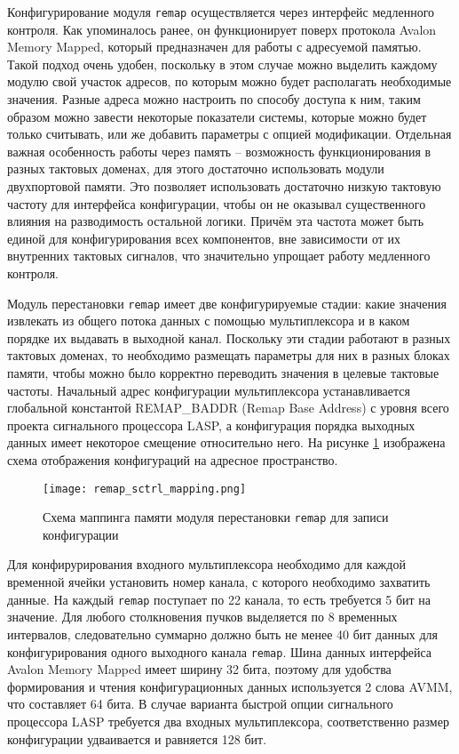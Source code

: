 Конфигурирование модуля \texttt{remap} осуществляется через интерфейс медленного контроля. Как упоминалось ранее, он функционирует поверх протокола Avalon Memory Mapped, который предназначен для работы с адресуемой памятью. Такой подход очень удобен, поскольку в этом случае можно выделить каждому модулю свой участок адресов, по которым можно будет располагать необходимые значения. Разные адреса можно настроить по способу доступа к ним, таким образом можно завести некоторые показатели системы, которые можно будет только считывать, или же добавить параметры с опцией модификации. Отдельная важная особенность работы через память -- возможность функционирования в разных тактовых доменах, для этого достаточно использовать модули двухпортовой памяти. Это позволяет использовать достаточно низкую тактовую частоту для интерфейса конфигурации, чтобы он не оказывал существенного влияния на разводимость остальной логики. Причём эта частота может быть единой для конфигурирования всех компонентов, вне зависимости от их внутренних тактовых сигналов, что значительно упрощает работу медленного контроля.\par
Модуль перестановки \texttt{remap} имеет две конфигурируемые стадии: какие значения извлекать из общего потока данных с помощью мультиплексора и в каком порядке их выдавать в выходной канал. Поскольку эти стадии работают в разных тактовых доменах, то необходимо размещать параметры для них в разных блоках памяти, чтобы можно было корректно переводить значения в целевые тактовые частоты. Начальный адрес конфигурации мультиплексора устанавливается глобальной константой REMAP\_BADDR (Remap Base Address) с уровня всего проекта сигнального процессора LASP, а конфигурация порядка выходных данных имеет некоторое смещение относительно него. На рисунке \ref{fig:remap_sctrl_mapping} изображена схема отображения конфигураций на адресное пространство.\par
\begin{figure}[ht]
    \centering
    \texttt{[image: remap\_sctrl\_mapping.png]}
    \caption{Схема маппинга памяти модуля перестановки \texttt{remap} для записи конфигурации}
    \label{fig:remap_sctrl_mapping}
\end{figure}\par
Для конфирурирования входного мультиплексора необходимо для каждой временной ячейки установить номер канала, с которого необходимо захватить данные. На каждый \texttt{remap} поступает по 22 канала, то есть требуется 5 бит на значение. Для любого столкновения пучков выделяется по 8 временных интервалов, следовательно суммарно должно быть не менее 40 бит данных для конфигурирования одного выходного канала \texttt{remap}. Шина данных интерфейса Avalon Memory Mapped имеет ширину 32 бита, поэтому для удобства формирования и чтения конфигурационных данных используется 2 слова AVMM, что составляет 64 бита. В случае варианта быстрой опции сигнального процессора LASP требуется два входных мультиплексора, соответственно размер конфигурации удваивается и равняется 128 бит.\par
